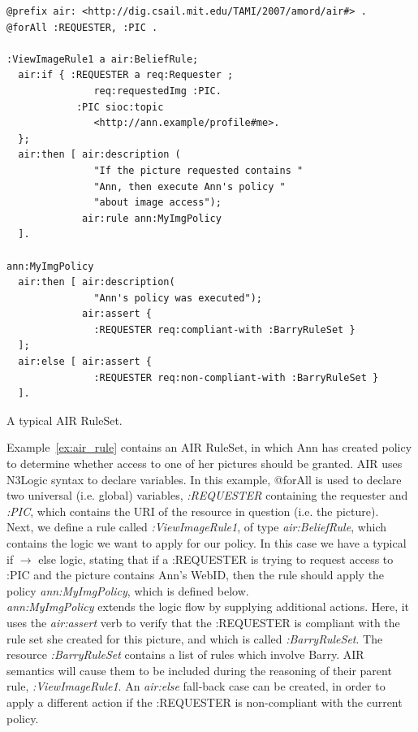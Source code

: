 \begin{example}[h]
\begin{verbatim}
@prefix air: <http://dig.csail.mit.edu/TAMI/2007/amord/air#> .
@forAll :REQUESTER, :PIC .

:ViewImageRule1 a air:BeliefRule;
  air:if { :REQUESTER a req:Requester ;
               req:requestedImg :PIC.
            :PIC sioc:topic
               <http://ann.example/profile#me>.
  };
  air:then [ air:description (
               "If the picture requested contains "
               "Ann, then execute Ann's policy "
               "about image access");
             air:rule ann:MyImgPolicy
  ].
  
ann:MyImgPolicy
  air:then [ air:description(
               "Ann's policy was executed");
             air:assert {
               :REQUESTER req:compliant-with :BarryRuleSet }
  ];
  air:else [ air:assert {
               :REQUESTER req:non-compliant-with :BarryRuleSet }
  ].
\end{verbatim}
\caption{A typical AIR RuleSet.}
\label{ex:air_rule}
\end{example}

Example~\ref{ex:air_rule} contains an AIR RuleSet, in which Ann has created policy to determine whether access to one of her pictures should be granted. AIR uses N3Logic syntax to declare variables. In this example, @forAll is used to declare two universal (i.e. global) variables, \textit{:REQUESTER} containing the requester and \textit{:PIC}, which contains the URI of the resource in question (i.e. the picture).\\

Next, we define a rule called \textit{:ViewImageRule1}, of type \textit{air:BeliefRule}, which contains the logic we want to apply for our policy. In this case we have a typical if $\rightarrow$ else logic, stating that if a :REQUESTER is trying to request access to :PIC and the picture contains Ann's WebID, then the rule should apply the policy \textit{ann:MyImgPolicy}, which is defined below.\\

\textit{ann:MyImgPolicy} extends the logic flow by supplying additional actions. Here, it uses the \textit{air:assert} verb to verify that the :REQUESTER is compliant with the rule set she created for this picture, and which is called \textit{:BarryRuleSet}. The resource \textit{:BarryRuleSet} contains a list of rules which involve Barry. AIR semantics will cause them to be included during the reasoning of their parent rule, \textit{:ViewImageRule1}. An \textit{air:else} fall-back case can be created, in order to apply a different action if the :REQUESTER is non-compliant with the current policy.



